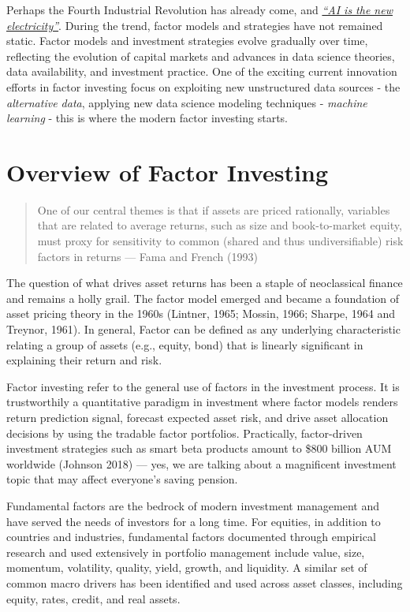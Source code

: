 \documentclass[
]{book}
\begin{document}
Perhaps the Fourth Industrial Revolution has already come, and \emph{\href{https://www.gsb.stanford.edu/insights/andrew-ng-why-ai-new-electricity}{``AI is the new electricity''}}. During the trend, factor models and strategies have not remained static. Factor models and investment strategies evolve gradually over time, reflecting the evolution of capital markets and advances in data science theories, data availability, and investment practice. One of the exciting current innovation efforts in factor investing focus on exploiting new unstructured data sources - the {\emph{alternative data}}, applying new data science modeling techniques - {\emph{machine learning}} - this is where the modern factor investing starts.

\hypertarget{overview-of-factor-investing}{%
\section{Overview of Factor Investing}\label{overview-of-factor-investing}}

\begin{quote}
One of our central themes is that if assets are priced rationally, variables that are related to average returns, such as size and book-to-market equity, must proxy for sensitivity to common (shared and thus undiversifiable) risk factors in returns --- Fama and French (1993)
\end{quote}

The question of what drives asset returns has been a staple of neoclassical finance and remains a holly grail. The factor model emerged and became a foundation of asset pricing theory in the 1960s (Lintner, 1965; Mossin, 1966; Sharpe, 1964 and Treynor, 1961). In general, Factor can be defined as any underlying characteristic relating a group of assets (e.g., equity, bond) that is linearly significant in explaining their return and risk.

Factor investing refer to the general use of factors in the investment process. It is trustworthily a quantitative paradigm in investment where factor models renders return prediction signal, forecast expected asset risk, and drive asset allocation decisions by using the tradable factor portfolios. Practically, factor-driven investment strategies such as smart beta products amount to \$800 billion AUM worldwide (Johnson 2018) --- yes, we are talking about a magnificent investment topic that may affect everyone's saving pension.

Fundamental factors are the bedrock of modern investment management and have served the needs of investors for a long time. For equities, in addition to countries and industries, fundamental factors documented through empirical research and used extensively in portfolio management include value, size, momentum, volatility, quality, yield, growth, and liquidity. A similar set of common macro drivers has been identified and used across asset classes, including equity, rates, credit, and real assets.
\end{document}
